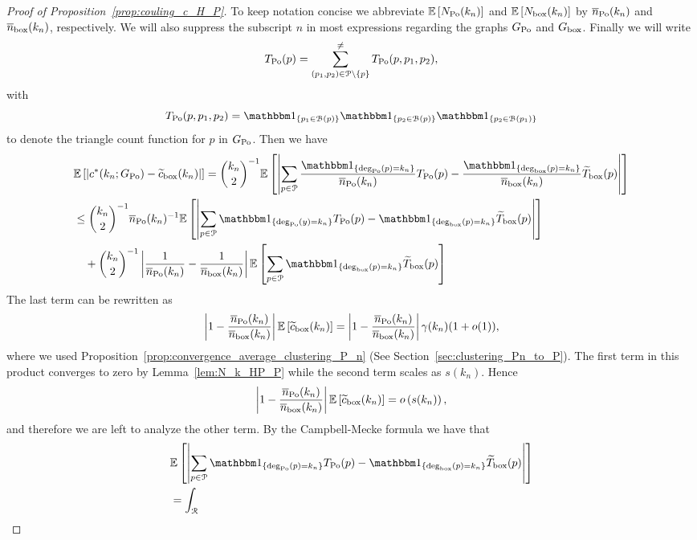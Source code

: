 \begin{proof}[Proof of Proposition~\ref{prop:couling_c_H_P}] 

To keep notation concise we abbreviate $\mathbb{E}\left[N_{{\mathrm{Po}}}(k_n)\right]$ and $\mathbb{E}\left[N_{\text{box}}(k_n)\right]$ by $\overline{n}_{{\mathrm{Po}}}(k_n)$ and $\overline{n}_{\mathrm{box}}(k_n)$, respectively. We will also suppress the subscript $n$ in most expressions regarding the graphs $G_{{\mathrm{Po}}}$ and $G_{\mathrm{box}}$. Finally we will write 
\[
	T_{{\mathrm{Po}}}(p) = \sum_{(p_1, p_2) \in {\mathcal P} \setminus \{p\}}^{\ne} T_{{\mathrm{Po}}}(p,p_1,p_2),
\] 
with
\[
	T_{\Po}(p,p_1,p_2) = \ind{p_1 \in \BallHyp{p}} \ind{p_2 \in \BallHyp{p}} \ind{p_2 \in \BallHyp{p_1}}
\]
to denote the triangle count function for $p$ in $G_{{\mathrm{Po}}}$. Then we have
\begin{align*} 
	&\Exp{\left|  c^\ast(k_n; \GPo) - \widetilde{c}_{\text{box}}(k_n)\right|}= 
	\binom{k_n}{2}^{-1}\Exp{\left|\sum_{p \in \Pcal} 
    	\frac{\ind{\mathrm{deg}_{\Po}(p) = k_n}}{\expH} T_{\Po}(p)
        - \frac{\ind{\mathrm{deg}_{\mathrm{box}}(p) = k_n}}{\expP}  \widetilde{T}_{\mathrm{box}}(p)\right|} \\
    &\le\binom{k_n}{2}^{-1} \expH^{-1} \Exp{\left|\sum_{p \in \Pcal} \ind{\mathrm{deg}_{\Po}(y) = k_n} T_{\Po}(p) 
    	- \ind{\mathrm{deg}_{\mathrm{box}}(p) = k_n} \widetilde{T}_{\text{box}}(p)\right|} \\
    &\hspace{10pt}+ \binom{k_n}{2}^{-1} \left|\frac{1}{\expH} - \frac{1}{\expP}\right|\Exp{
        	\sum_{p \in \Pcal} \ind{\mathrm{deg}_{\mathrm{box}}(p) = k_n} \widetilde{T}_{\text{box}}(p) }
\end{align*}
The last term can be rewritten as
\begin{align*}
	\left|1 - \frac{\overline{n}_{{\mathrm{Po}}}(k_n)}{\overline{n}_{\mathrm{box}}(k_n)}\right| \mathbb{E}\left[\widetilde{c}_{\text{box}}(k_n)\right] = \left|1 - \frac{\overline{n}_{{\mathrm{Po}}}(k_n)}{\overline{n}_{\mathrm{box}}(k_n)}\right|\gamma(k_n)(1+o(1)),
\end{align*}
where we used Proposition~\ref{prop:convergence_average_clustering_P_n} (See Section~\ref{sec:clustering_Pn_to_P}). The first term in this product converges to zero by Lemma~\ref{lem:N_k_HP_P} while the second term scales as $s(k_n)$. Hence
\[
	\left|1 - \frac{\overline{n}_{{\mathrm{Po}}}(k_n)}{\overline{n}_{\mathrm{box}}(k_n)}\right| \mathbb{E}\left[\widetilde{c}_{\text{box}}(k_n)\right] = o\left(s(k_n)\right),
\]
and therefore we are left to analyze the other term. By the Campbell-Mecke formula we have that
\begin{align*}
	    &\Exp{\left|\sum_{p \in \Pcal} \ind{\mathrm{deg}_{\Po}(p) = k_n} T_{\Po}(p) 
	        	- \ind{\mathrm{deg}_{\mathrm{box}}(p) = k_n} \widetilde{T}_{\text{box}}(p)\right|} \\
	    &= \int_{\Rcal} 

\end{align*}
\end{proof}
